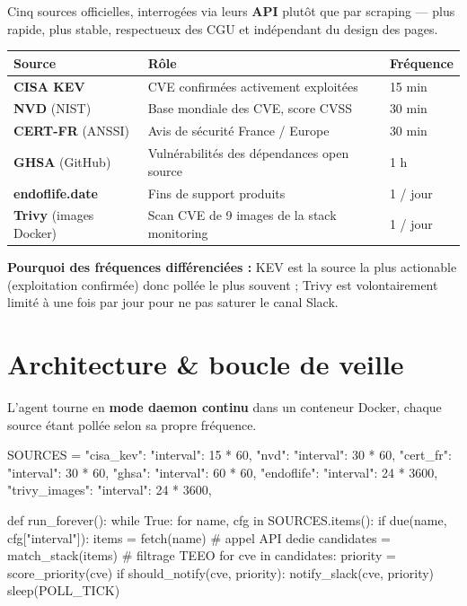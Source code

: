 \documentclass[11pt,a4paper]{article}
\begin{document}
Cinq sources officielles, interrogées via leurs \textbf{API} plutôt que par scraping — plus rapide, plus stable, respectueux des CGU et indépendant du design des pages.

\renewcommand{\arraystretch}{1.3}
\begin{tabularx}{\linewidth}{@{}l X l@{}}
\toprule
\rowcolor{light} Source & Rôle & Fréquence \\ \midrule
\textbf{CISA KEV} & CVE confirmées activement exploitées & 15 min \\
\textbf{NVD} (NIST) & Base mondiale des CVE, score CVSS & 30 min \\
\textbf{CERT-FR} (ANSSI) & Avis de sécurité France / Europe & 30 min \\
\textbf{GHSA} (GitHub) & Vulnérabilités des dépendances open source & 1 h \\
\textbf{endoflife.date} & Fins de support produits & 1 / jour \\
\textbf{Trivy} (images Docker) & Scan CVE de 9 images de la stack monitoring & 1 / jour \\
\bottomrule
\end{tabularx}

\textbf{Pourquoi des fréquences différenciées :} KEV est la source la plus actionable (exploitation confirmée) donc pollée le plus souvent ; Trivy est volontairement limité à une fois par jour pour ne pas saturer le canal Slack.

\section{Architecture \& boucle de veille}

L'agent tourne en \textbf{mode daemon continu} dans un conteneur Docker, chaque source étant pollée selon sa propre fréquence.

\begin{pybox}
SOURCES = {
    "cisa_kev":      {"interval": 15 * 60},
    "nvd":           {"interval": 30 * 60},
    "cert_fr":       {"interval": 30 * 60},
    "ghsa":          {"interval": 60 * 60},
    "endoflife":     {"interval": 24 * 3600},
    "trivy_images":  {"interval": 24 * 3600},
}

def run_forever():
    while True:
        for name, cfg in SOURCES.items():
            if due(name, cfg["interval"]):
                items = fetch(name)          # appel API dedie
                candidates = match_stack(items)   # filtrage TEEO
                for cve in candidates:
                    priority = score_priority(cve)
                    if should_notify(cve, priority):
                        notify_slack(cve, priority)
        sleep(POLL_TICK)
\end{pybox}
\end{document}
